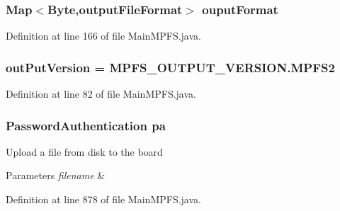 \subsubsection[{ouput\+Format}]{\setlength{\rightskip}{0pt plus 5cm}Map$<$Byte,{\bf output\+File\+Format}$>$ ouput\+Format}\label{class_microchip_m_p_f_s_1_1_main_m_p_f_s_adfa006b2a7842cb08d71396d62c6ac9f}


Definition at line 166 of file Main\+M\+P\+F\+S.\+java.

\hypertarget{class_microchip_m_p_f_s_1_1_main_m_p_f_s_a1400453cb8838a64ba2906f6e3e1c5a1}{}
\subsubsection[{out\+Put\+Version}]{ out\+Put\+Version = {\bf M\+P\+F\+S\+\_\+\+O\+U\+T\+P\+U\+T\+\_\+\+V\+E\+R\+S\+I\+O\+N.\+M\+P\+F\+S2}}\label{class_microchip_m_p_f_s_1_1_main_m_p_f_s_a1400453cb8838a64ba2906f6e3e1c5a1}


Definition at line 82 of file Main\+M\+P\+F\+S.\+java.

\hypertarget{class_microchip_m_p_f_s_1_1_main_m_p_f_s_a0c2e99bc0a1694315e6941fb4ae6bbd9}{}
\subsubsection[{pa}]{\setlength{\rightskip}{0pt plus 5cm}Password\+Authentication pa}\label{class_microchip_m_p_f_s_1_1_main_m_p_f_s_a0c2e99bc0a1694315e6941fb4ae6bbd9}


Upload a file from disk to the board 


\begin{DoxyParams}{Parameters}
{\em filename} & \\
\hline
\end{DoxyParams}


Definition at line 878 of file Main\+M\+P\+F\+S.\+java.

\hypertarget{class_microchip_m_p_f_s_1_1_main_m_p_f_s_ae483b74d95985e21e780c8421fcef770}{}
